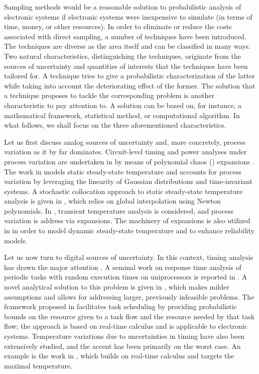 Sampling methods would be a reasonable solution to probabilistic analysis of
electronic systems if electronic systems were inexpensive to simulate (in terms
of time, money, or other resources). In order to eliminate or reduce the costs
associated with direct sampling, a number of techniques have been introduced.
The techniques are diverse as the area itself and can be classified in many
ways. Two natural characteristics, distinguishing the techniques, originate from
the sources of uncertainty and quantities of interests that the techniques have
been tailored for. A technique tries to give a probabilistic characterization of
the latter while taking into account the deteriorating effect of the former. The
solution that a technique proposes to tackle the corresponding problem is
another characteristic to pay attention to. A solution can be based on, for
instance, a mathematical framework, statistical method, or computational
algorithm. In what follows, we shall focus on the three aforementioned
characteristics.

Let us first discuss analog sources of uncertainty and, more concretely, process
variation as it by far dominates. Circuit-level timing and power analyses under
process variation are undertaken in \cite{bhardwaj2008} by means of polynomial
chaos () expansions \cite{xiu2010}. The work in \cite{juan2012} models
static steady-state temperature and accounts for process variation by leveraging
the linearity of Gaussian distributions and time-invariant systems. A stochastic
collocation \cite{xiu2010} approach to static steady-state temperature analysis
is given in \cite{lee2013}, which relies on global interpolation using Newton
polynomials. In \cite{ukhov2014}, transient temperature analysis is considered,
and process variation is address via  expansions. The machinery of
 expansions is also utilized in \cite{ukhov2015} in order to model
dynamic steady-state temperature \cite{ukhov2012} and to enhance reliability
models.

Let us now turn to digital sources of uncertainty. In this context, timing
analysis has drawn the major attention \cite{quinton2012}. A seminal work on
response time analysis of periodic tasks with random execution times on
uniprocessors is reported in \cite{diaz2002}. A novel analytical solution to
this problem is given in \cite{tanasa2015}, which makes milder assumptions and
allows for addressing larger, previously infeasible problems. The framework
proposed in \cite{santinelli2011} facilitates task scheduling by providing
probabilistic bounds on the resource given to a task flow and the resource
needed by that task flow; the approach is based on real-time calculus and is
applicable to electronic systems. Temperature variations due to uncertainties in
timing have also been extensively studied, and the accent has been primarily on
the worst case. An example is the work in \cite{yang2013}, which builds on
real-time calculus and targets the maximal temperature.

